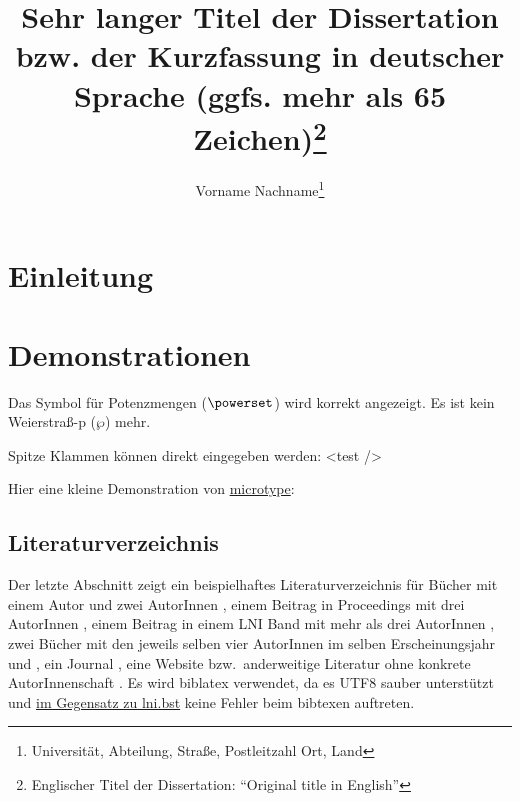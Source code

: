 \documentclass[draft,utf8,biblatex,norunningheads]{lni}
\title[Kurztitel (optional, max. 65 Zeichen)]{Sehr langer Titel der Dissertation bzw. der Kurzfassung in
  deutscher Sprache (ggfs. mehr als 65 Zeichen)\footnote{\todo[inlinewidth=.98\linewidth]{Wenn die Dissertation auf Englisch
      verfasst wurde, Originaltitel anführen!}Englischer Titel der Dissertation: ``Original title in English''}}
\author[Vorname Nachname]
{Vorname Nachname\footnote{Universität, Abteilung, Straße,
    Postleitzahl Ort, Land \email{vornamen.nachname@example.org}}}
\begin{document}
\maketitle



\begin{abstract}
   \blindtext
\end{abstract}

\section{Einleitung}

\blindtext

\section{Demonstrationen}
\label{sec:demos}
Das Symbol für Potenzmengen ($\powerset$) wird korrekt angezeigt.
Es ist kein Weierstraß-p ($\wp$) mehr.

Spitze Klammen können direkt eingegeben werden: <test />

Hier eine kleine Demonstration von \href{https://www.ctan.org/pkg/microtype}{microtype}:
\blindtext

\subsection{Literaturverzeichnis}


Der letzte Abschnitt zeigt ein beispielhaftes Literaturverzeichnis für Bücher mit einem Autor \cite{Ez10} und zwei AutorInnen \cite{AB00}, einem Beitrag in Proceedings mit drei AutorInnen \cite{ABC01}, einem Beitrag in einem LNI Band mit mehr als drei AutorInnen \cite{Az09}, zwei Bücher mit den jeweils selben vier AutorInnen im selben Erscheinungsjahr \cite{Wa14} und \cite{Wa14b}, ein Journal \cite{Gl06}, eine Website \cite{GI19} bzw.\ anderweitige Literatur ohne konkrete AutorInnenschaft \cite{XX14}.
Es wird biblatex verwendet, da es UTF8 sauber unterstützt und \href{https://github.com/gi-ev/LNI/issues/5}{im Gegensatz zu lni.bst} keine Fehler beim bibtexen auftreten.
\end{document}
